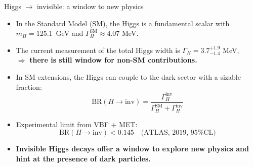 \documentclass{../../bredelebeamer}
\begin{document}
\begin{frame}{Higgs $\to$ invisible: a window to new physics}
  \begin{itemize}
    \item In the Standard Model (SM), the Higgs is a fundamental scalar with $m_H = 125.1$~GeV and $\Gamma_H^{\text{SM}} \approx 4.07$ MeV.
    \vfill
    \item The current measurement of the total Higgs width is $\Gamma_H = 3.7^{+1.9}_{-1.4}$ MeV,\\ $\Rightarrow$ \textbf{there is still window for non-SM contributions.}
    \vfill
    \item In SM extensions, the Higgs can couple to the dark sector with a sizable fraction:
    \[
      \text{BR}(H \to \text{inv}) = \frac{\Gamma_H^{\text{inv}}}{\Gamma_H^{\text{SM}} + \Gamma_H^{\text{inv}}}
    \]
    
    \item Experimental limit from VBF + MET:
    \[
      \text{BR}(H \to \text{inv}) < 0.145 \quad \text{(ATLAS, 2019, 95\% CL)}
    \]
    \vfill
    \item  \textbf{Invisible Higgs decays offer a window to explore new physics and hint at the presence of dark particles.}
  \end{itemize}
\end{frame}
\end{document}
